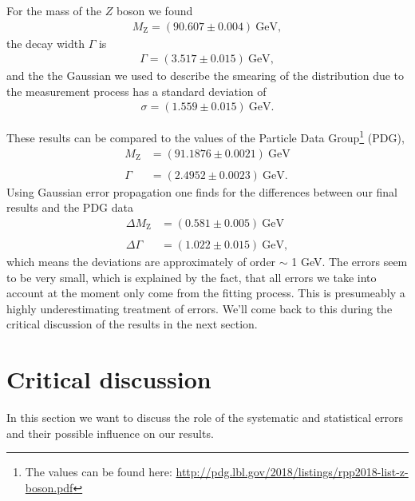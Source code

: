\documentclass[twocolumn,
			   showpacs,%
               nofootinbib,
               aps,%
               prd,
               notitlepage,
               showkeys,
               10pt]{revtex4-1}
\begin{document}
For the mass of the $Z$ boson we found
\begin{align}
	M_{\mathrm{Z}} = (90.607 \pm 0.004) \ \text{GeV},
\end{align} 
the decay width $\Gamma$ is
\begin{align}
\Gamma = (3.517 \pm 0.015) \ \text{GeV},	
\end{align}
and the the Gaussian we used to describe the smearing of the distribution due to the measurement process has a standard deviation of 
\begin{align}
	\sigma = (1.559 \pm 0.015) \ \text{GeV}.
\end{align}

These results can be compared to the values of the Particle Data Group\footnote{The values can be found here: \url{http://pdg.lbl.gov/2018/listings/rpp2018-list-z-boson.pdf}} (PDG), 
\begin{align}
	M_{\mathrm{Z}}&=(91.1876 \pm 0.0021) \ \mathrm{GeV} \\  \nonumber\\ \Gamma&=(2.4952 \pm 0.0023) \ \mathrm{GeV}.
\end{align} 
Using Gaussian error propagation one finds for the differences between our final results and the PDG data
\begin{align}
	\Delta M_{\mathrm{Z}}&=(0.581 \pm 0.005) \ \mathrm{GeV} \\  \nonumber\\ 
	\Delta\Gamma&=(1.022 \pm 0.015) \ \mathrm{GeV},
\end{align} 
which means the deviations are approximately of order $\sim$ 1 GeV. The errors seem to be very small, which is explained by the fact, that all errors we take into account at the moment only come from the fitting process. This is presumeably a highly underestimating treatment of errors. We'll come back to this during the critical discussion of the results in the next section.
\section{Critical discussion}
In this section we want to discuss the role of the systematic and statistical errors and their possible influence on our results.\\
\end{document}
